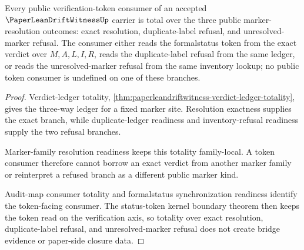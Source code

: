 \begin{theorem}
\label{thm:paper-lean-drift-witness-public-token-consumer-totality}
Every public verification-token consumer of an accepted $\PaperLeanDriftWitnessUp$ carrier is total over the three public marker-resolution outcomes: exact resolution, duplicate-label refusal, and unresolved-marker refusal. The consumer either reads the formalstatus token from the exact verdict over $M,A,L,I,R$, reads the duplicate-label refusal from the same ledger, or reads the unresolved-marker refusal from the same inventory lookup; no public token consumer is undefined on one of these branches.
\end{theorem}
\begin{proof}
Verdict-ledger totality, \autoref{thm:paperleandriftwitness-verdict-ledger-totality}, gives the three-way ledger for a fixed marker site. Resolution exactness supplies the exact branch, while duplicate-ledger readiness and inventory-refusal readiness supply the two refusal branches.

Marker-family resolution readiness keeps this totality family-local. A token consumer therefore cannot borrow an exact verdict from another marker family or reinterpret a refused branch as a different public marker kind.

Audit-map consumer totality and formalstatus synchronization readiness identify the token-facing consumer. The status-token kernel boundary theorem then keeps the token read on the verification axis, so totality over exact resolution, duplicate-label refusal, and unresolved-marker refusal does not create bridge evidence or paper-side closure data.
\end{proof}

